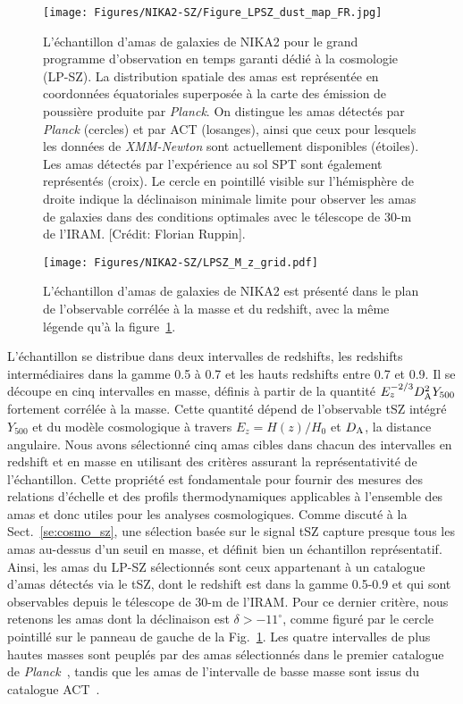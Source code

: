%
\begin{figure}
  \centering
  \texttt{[image: Figures/NIKA2-SZ/Figure\_LPSZ\_dust\_map\_FR.jpg]}
  \caption{L'échantillon d'amas de galaxies de NIKA2 pour le grand programme d'observation en temps garanti dédié à la cosmologie (LP-SZ). La distribution spatiale des amas est représentée en coordonnées équatoriales superposée à la carte des émission de poussière produite par \emph{Planck}. On distingue les amas détectés par \emph{Planck} (cercles) et par ACT (losanges), ainsi que ceux pour lesquels les données de \emph{XMM-Newton} sont actuellement disponibles (étoiles). Les amas détectés par l'expérience au sol SPT sont également représentés (croix). Le cercle en pointillé visible sur l'hémisphère de droite indique la déclinaison minimale limite pour observer les amas de galaxies dans des conditions optimales avec le télescope de 30-m de l'IRAM. [Crédit: Florian Ruppin].} 
  \label{fig:LP-SZ}
\end{figure}
%
%
\begin{figure}
  \centering
  \texttt{[image: Figures/NIKA2-SZ/LPSZ\_M\_z\_grid.pdf]}
  \caption{L'échantillon d'amas de galaxies de NIKA2 est présenté dans le plan de l'observable corrélée à la masse et du redshift, avec la même légende qu'à la figure~\ref{fig:LP-SZ}.} 
  \label{fig:LP-SZ-2}
\end{figure}
%

L'échantillon se distribue dans
deux intervalles de redshifts, les redshifts intermédiaires dans la
gamme 0.5 à 0.7 et les hauts redshifts entre 0.7 et 0.9. Il se découpe
en cinq intervalles en masse, définis à partir de la quantité
$E_{z}^{-2/3} D_{\rm{A}}^2 Y_{500}$ fortement corrélée à la masse. Cette
quantité dépend de l'observable tSZ intégré $Y_{500}$ et du modèle
cosmologique à travers $E_{z} = H(z)/H_0$ et $D_{\rm{A}}$, la distance
angulaire. Nous avons sélectionné cinq amas cibles dans chacun des
intervalles en redshift et en masse en utilisant des critères assurant
la représentativité de l'échantillon. Cette propriété est fondamentale
pour fournir des mesures des relations d'échelle et des profils
thermodynamiques applicables à l'ensemble des amas et donc utiles pour
les analyses cosmologiques. Comme discuté à la Sect.~\ref{se:cosmo_sz}, une
sélection basée sur le signal tSZ capture presque tous les amas
au-dessus d'un seuil en masse, et définit bien un échantillon
représentatif. Ainsi, les amas du LP-SZ sélectionnés sont ceux
appartenant à un catalogue d'amas détectés via le tSZ, dont le
redshift est dans la gamme 0.5-0.9 et qui sont observables depuis le
télescope de 30-m de l'IRAM. Pour ce dernier critère, nous retenons
les amas dont la déclinaison est $\delta > -11^{\circ}$, comme figuré
par le cercle pointillé sur le panneau de gauche de la
Fig.~\ref{fig:LP-SZ}. Les quatre intervalles de plus hautes masses sont
peuplés par des amas sélectionnés dans le premier catalogue de
\emph{Planck}~\citep[le seul disponible au moment de la définition de
l'échantillon][]{Planck2013_SZcat}, tandis que les amas de
l'intervalle de basse masse sont issus du catalogue
ACT~\citep{Hasselfield2013_ACT_SZ}.

